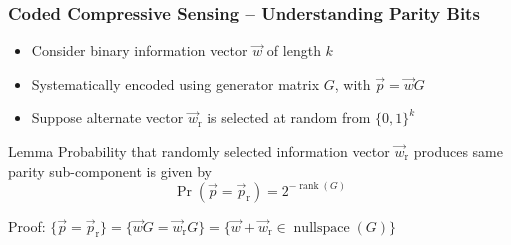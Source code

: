 \documentclass[10pt]{beamer}
\begin{document}
\begin{frame}
\frametitle{Coded Compressive Sensing -- Understanding Parity Bits}
\begin{center}
{}
\end{center}
\begin{itemize}
\item Consider binary information vector $\vec{w}$ of length $k$
\item Systematically encoded using generator matrix $G$, with
$\vec{p} = \vec{w} G$
\item Suppose alternate vector $\vec{w}_{\mathrm{r}}$ is selected at random from $\{ 0, 1 \}^k$
\end{itemize}

\begin{block}{Lemma}
Probability that randomly selected information vector $\vec{w}_{\mathrm{r}}$ produces same parity sub-component is given by
\begin{equation*}
\Pr (\vec{p} = \vec{p}_{\mathrm{r}}) = {2^{-\operatorname{rank}(G)}}
\end{equation*}
\end{block}
\textcolor{frametitle.fg}{Proof:}
$\{ \vec{p} = \vec{p}_{\mathrm{r}} \}
= \{ \vec{w} G = \vec{w}_{\mathrm{r}} G \}
= \{ \vec{w} + \vec{w}_{\mathrm{r}} \in \operatorname{nullspace}(G) \}$
\end{frame}
\end{document}
